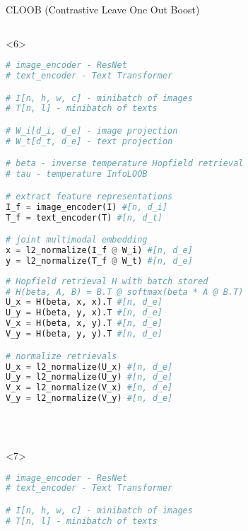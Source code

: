 \documentclass[utf8,aspectratio=169,ngerman,english,usenames,dvipsnames]{beamer}
\begin{document}
\begin{frame}[fragile]{CLOOB (Contrastive Leave One Out Boost)}
\begin{minipage}{0.8\textwidth}
\begin{onlyenv}
\begin{multicols}{2}
\begin{lstlisting}[language=Python, basicstyle=\tiny, firstnumber=last]
 \end{lstlisting}
            \end{multicols}
        \end{onlyenv}

        \begin{onlyenv}<6>
            \begin{multicols}{2}
                \begin{lstlisting}[language=Python, basicstyle=\tiny]
# image_encoder - ResNet
# text_encoder - Text Transformer

# I[n, h, w, c] - minibatch of images
# T[n, l] - minibatch of texts

# W_i[d_i, d_e] - image projection
# W_t[d_t, d_e] - text projection

# beta - inverse temperature Hopfield retrieval
# tau - temperature InfoLOOB

# extract feature representations
I_f = image_encoder(I) #[n, d_i]
T_f = text_encoder(T) #[n, d_t]

# joint multimodal embedding
x = l2_normalize(I_f @ W_i) #[n, d_e]
y = l2_normalize(T_f @ W_t) #[n, d_e]\end{lstlisting}
                \columnbreak
                \begin{lstlisting}[language=Python, basicstyle=\tiny, firstnumber=last]
# Hopfield retrieval H with batch stored
# H(beta, A, B) = B.T @ softmax(beta * A @ B.T)
U_x = H(beta, x, x).T #[n, d_e]
U_y = H(beta, y, x).T #[n, d_e]
V_x = H(beta, x, y).T #[n, d_e]
V_y = H(beta, y, y).T #[n, d_e]

# normalize retrievals
U_x = l2_normalize(U_x) #[n, d_e] 
U_y = l2_normalize(U_y) #[n, d_e] 
V_x = l2_normalize(V_x) #[n, d_e] 
V_y = l2_normalize(V_y) #[n, d_e]





 \end{lstlisting}
            \end{multicols}
        \end{onlyenv}

        \begin{onlyenv}<7>
            \begin{multicols}{2}
                \begin{lstlisting}[language=Python, basicstyle=\tiny]
# image_encoder - ResNet
# text_encoder - Text Transformer

# I[n, h, w, c] - minibatch of images
# T[n, l] - minibatch of texts


\end{lstlisting}
\end{multicols}
\end{onlyenv}
\end{minipage}
\end{frame}
\end{document}
